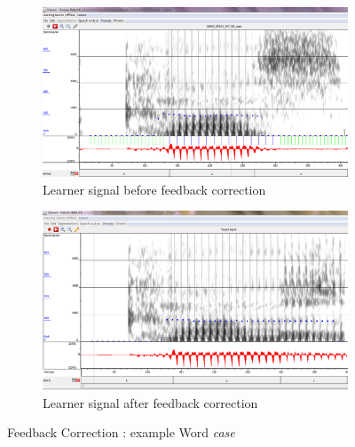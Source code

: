 \documentclass[11pt]{beamer}
\begin{document}
\begin{frame}
\begin{figure}
\begin{subfigure}{.5\textwidth}
  \centering
  \includegraphics[width=0.9\linewidth]{images/case_learner.PNG}
  \caption{Learner signal before feedback correction}
  \label{fig:sfig1}
\end{subfigure}%
\begin{subfigure}{.5\textwidth}
  \centering
  \includegraphics[width=0.86\linewidth]{images/case_target_2.PNG}
  \caption{Learner signal after feedback correction}
  \label{fig:sfig2}
\end{subfigure}
\caption{Feedback Correction : example Word \emph{case}}
\label{fig:fig}
\end{figure}
\end{frame}
\end{document}
